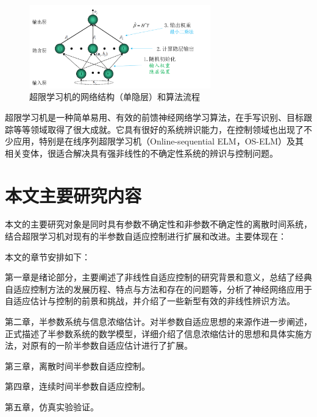 \begin{figure}
 \centering
 \includegraphics[width=0.7\textwidth]{figures/ELM}
 \caption{超限学习机的网络结构（单隐层）和算法流程}\label{fig:elm}
\end{figure}

超限学习机是一种简单易用、有效的前馈神经网络学习算法，在手写识别、目标跟踪等等领域取得了很大成就。它具有很好的系统辨识能力，在控制领域也出现了不少应用，特别是在线序列超限学习机（Online-sequential ELM，OS-ELM）及其相关变体，很适合解决具有强非线性的不确定性系统的辨识与控制问题。

\section{本文主要研究内容}

本文的主要研究对象是同时具有参数不确定性和非参数不确定性的离散时间系统，结合超限学习机对现有的半参数自适应控制进行扩展和改进。主要体现在：

本文的章节安排如下：

第一章是绪论部分，主要阐述了非线性自适应控制的研究背景和意义，总结了经典自适应控制方法的发展历程、特点与方法和存在的问题等，分析了神经网络应用于自适应估计与控制的前景和挑战，并介绍了一些新型有效的非线性辨识方法。

第二章，半参数系统与信息浓缩估计。对半参数自适应思想的来源作进一步阐述，正式描述了半参数系统的数学模型，详细介绍了信息浓缩估计的思想和具体实施方法，对原有的一阶半参数自适应估计进行了扩展。

第三章，离散时间半参数自适应控制。

第四章，连续时间半参数自适应控制。

第五章，仿真实验验证。
